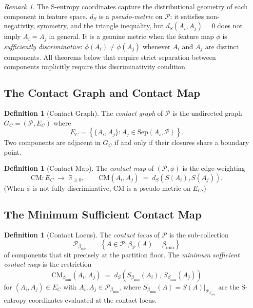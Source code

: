 \documentclass[12pt,a4paper,twocolumn]{article}
\theoremstyle{plain}
\theoremstyle{definition}
\newtheorem{definition}[theorem]{Definition}
\theoremstyle{remark}
\newtheorem{remark}[theorem]{Remark}
\newcommand{\Part}{\mathcal{P}}
\newcommand{\Sep}{\mathrm{Sep}}
\newcommand{\CM}{\mathrm{CM}}
\newcommand{\bmin}{\beta_{\min}}
\newcommand{\bP}{\beta_{\mathcal{P}}}
\newcommand{\Scoord}{S}
\newcommand{\dS}{d_S}
\newcommand{\CMbmin}{\CM_{\bmin}}
\newcommand{\GC}{G_C}
\newcommand{\Sbmin}{S_{\bmin}}
\newcommand{\Real}{\mathbb{R}}
\begin{document}
\begin{remark}
The S-entropy coordinates capture the distributional geometry of each
component in feature space.  $\dS$ is a \emph{pseudo-metric} on $\Part$:
it satisfies non-negativity, symmetry, and the triangle inequality, but
$\dS(A_i, A_j) = 0$ does not imply $A_i = A_j$ in general.  It is a
genuine metric when the feature map $\phi$ is \emph{sufficiently
discriminative}: $\phi(A_i) \neq \phi(A_j)$ whenever $A_i$ and $A_j$ are
distinct components.  All theorems below that require strict separation
between components implicitly require this discriminativity condition.
\end{remark}

\subsection{The Contact Graph and Contact Map}

\begin{definition}[Contact Graph]
\label{def:contact-graph}
The \emph{contact graph} of $\Part$ is the undirected graph
$\GC = (\Part, E_C)$ where
\begin{equation}
  E_C = \left\{\{A_i, A_j\} : A_j \in \Sep(A_i, \Part)\right\}.
\end{equation}
Two components are adjacent in $\GC$ if and only if their closures share a
boundary point.
\end{definition}

\begin{definition}[Contact Map]
\label{def:contact-map}
The \emph{contact map} of $(\Part, \phi)$ is the edge-weighting
\begin{equation}
  \CM : E_C \;\longrightarrow\; \Real_{\geq 0}, \qquad
  \CM(A_i, A_j) \;=\; \dS(S(A_i), S(A_j)).
\end{equation}
(When $\phi$ is not fully discriminative, $\CM$ is a pseudo-metric on $E_C$.)
\end{definition}

\subsection{The Minimum Sufficient Contact Map}

\begin{definition}[Contact Locus]
\label{def:contact-locus}
The \emph{contact locus} of $\Part$ is the sub-collection
\begin{equation}
  \Part_{\bmin} \;=\; \left\{ A \in \Part : \bP(A) = \bmin \right\}
\end{equation}
of components that sit precisely at the partition floor.  The
\emph{minimum sufficient contact map} is the restriction
\begin{equation}
  \CMbmin(A_i, A_j) \;=\; \dS\!\left(\Sbmin(A_i),\, \Sbmin(A_j)\right)
\end{equation}
for $(A_i, A_j) \in E_C$ with $A_i, A_j \in \Part_{\bmin}$, where
$\Sbmin(A) = \Scoord(A)|_{\Part_{\bmin}}$ are the S-entropy coordinates
evaluated at the contact locus.
\end{definition}
\end{document}
